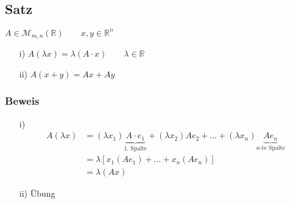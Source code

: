 \documentclass[12pt,titlepage, pdf]{article}
\newcommand{\R}{\mathds{R}}
\renewcommand{\>}{\rightarrow}
\renewcommand{\*}{\cdot}
\begin{document}
\subsection{Satz}
$A \in \mathcal{M}_{m,n}(\R)\qquad x,y \in \R^n$\\
\begin{itemize}
	\item[i)] $A(\lambda x) = \lambda (A \cdot x) \qquad \lambda \in \R$
	\item[ii)] $A(x+y) = Ax +  Ay$
\end{itemize}
\subsubsection*{Beweis}
\begin{itemize}
	\item[i)] \begin{align*}
	A(\lambda x) &= (\lambda x_1) \underbrace{A \cdot e_1}_{\textrm{1. Spalte}} + (\lambda x_2)A e_2 +...+ (\lambda x_n)\underbrace{A e_n}_{n\textrm{-te Spalte}}\\
	&= \lambda[x_1 (Ae_1) + ... + x_n (Ae_n)] \\
	&= \lambda (Ax)
	\end{align*}
	\item[ii)] Übung
\end{itemize}
\end{document}
